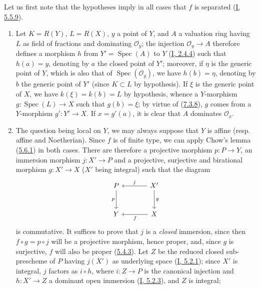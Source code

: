 Let us first note that the hypotheses imply in all cases that $f$ is
separated (\hyperref[I.5.5.9]{I, 5.5.9}).
\begin{enumerate}
\item[\rm (i)] Let $K=R(Y)$, $L=R(X)$, $y$ a point of $Y$, and $A$ a valuation
ring having $L$ as field of fractions and dominating
$\mathcal{O}_y$; the injection $\mathcal{O}_y\to A$ therefore defines a morphism
$h$ from $Y'=\operatorname{Spec}(A)$ to $Y$
(\hyperref[I.2.4.4]{I, 2.4.4}) such that $h(a)=y$, denoting by $a$ the
closed point of $Y'$; moreover, if $\eta$ is the generic point of $Y$, which
is also that of $\operatorname{Spec}(\mathcal{O}_y)$, we have $h(b)=\eta$,
denoting by $b$ the generic point of $Y'$ (since $K\subset L$ by
hypothesis). If $\xi$ is the generic point of $X$, we have $k(\xi)=k(b)=L$ by
hypothesis, whence a $Y$-morphism $g:\operatorname{Spec}(L)\to X$ such that
$g(b)=\xi$; by virtue of (\hyperref[II.7.3.8]{7.3.8}), $g$ comes from a
$Y$-morphism $g':Y'\to X$. If $x=g'(a)$, it is clear that $A$ dominates
$\mathcal{O}_x$.
\item[\rm (ii)] The question being local on $Y$, we may always suppose
that $Y$ is affine (resp. affine and Noetherian). Since $f$ is of finite type,
we can apply Chow's lemma (\hyperref[II.5.6.1]{5.6.1}) in both cases.
There are therefore a projective morphism
$p:P\to Y$, an immersion morphism $j:X'\to P$ and a projective,
surjective and birational morphism $g:X'\to X$ ($X'$ being integral) such that
the diagram
\[
\begin{tikzcd}[column sep=large,row sep=large]
P \arrow[d,"p"'] & X' \arrow[l,"j"'] \arrow[d,"g"] \\
Y & X \arrow[l,"f"]
\end{tikzcd}
\]
is commutative. It suffices to prove that $j$ is a \emph{closed} immersion,
since then $f\circ g=p\circ j$ will be a projective morphism, hence proper, and,
since $g$ is surjective, $f$ will also be proper
(\hyperref[II.5.4.3]{5.4.3}). Let $Z$ be the reduced closed sub-prescheme of
$P$ having $\overline{j(X')}$ as underlying space
(\hyperref[I.5.2.1]{I, 5.2.1}); since $X'$ is integral, $j$ factors
as $i\circ h$, where $i:Z\to P$ is the canonical injection and $h:X'\to Z$ a
dominant open immersion (\hyperref[I.5.2.3]{I, 5.2.3}), and $Z$ is
integral;


\end{enumerate}
